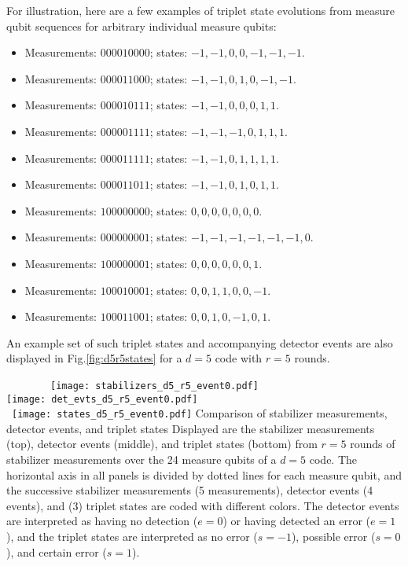 For illustration, here are a few examples of triplet state evolutions from measure qubit sequences for arbitrary individual measure qubits:
\begin{itemize}
\item Measurements: $000010000$; states: $-1,-1,0,0,-1,-1,-1$.
\item Measurements: $000011000$; states: $-1,-1,0,1,0,-1,-1$.
\item Measurements: $000010111$; states: $-1,-1,0,0,0,1,1$.
\item Measurements: $000001111$; states: $-1,-1,-1,0,1,1,1$.
\item Measurements: $000011111$; states: $-1,-1,0,1,1,1,1$.
\item Measurements: $000011011$; states: $-1,-1,0,1,0,1,1$.
\item Measurements: $100000000$; states: $0,0,0,0,0,0,0$.
\item Measurements: $000000001$; states: $-1,-1,-1,-1,-1,-1,0$.
\item Measurements: $100000001$; states: $0,0,0,0,0,0,1$.
\item Measurements: $100010001$; states: $0,0,1,1,0,0,-1$.
\item Measurements: $100011001$; states: $0,0,1,0,-1,0,1$.
\end{itemize}
An example set of such triplet states and accompanying detector events are also displayed in Fig.\ref{fig:d5r5states} for a $d=5$ code with $r=5$ rounds.

\begin{figure*}[htb]
\centering
~~~~~~~~\texttt{[image: stabilizers\_d5\_r5\_event0.pdf]} \\
\texttt{[image: det\_evts\_d5\_r5\_event0.pdf]} \\
~\texttt{[image: states\_d5\_r5\_event0.pdf]}
\ccaption
{Comparison of stabilizer measurements, detector events, and triplet states}
{
Displayed are the stabilizer measurements (top), detector events (middle), and triplet states (bottom) from $r=5$ rounds of stabilizer measurements over the 24 measure qubits of a $d=5$ code. The horizontal axis in all panels is divided by dotted lines for each measure qubit, and the successive stabilizer measurements (5 measurements), detector events (4  events), and (3) triplet states are coded with different colors. The detector events are interpreted as having no detection ($e=0$) or having detected an error ($e=1$), and the triplet states are interpreted as no error ($s=-1$), possible error ($s=0$), and certain error ($s=1$).
}
\label{fig:d5r5states}
\end{figure*}

